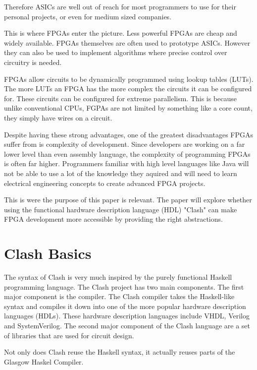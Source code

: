 \documentclass{article}
\begin{document}
\begin{multicols}{2}
    Therefore ASICs are well out of reach for most programmers to use for their personal projects, or even for
    medium sized companies.

    This is where FPGAs enter the picture. Less powerful FPGAs are cheap and widely available. FPGAs themselves
    are often used to prototype ASICs. However they can also be used to implement algorithms where precise control
    over circuitry is needed.

    FPGAs allow circuits to be dynamically programmed using lookup tables (LUTs). The more LUTs an FPGA
    has the more complex the circuits it can be configured for. These circuits can be configured for
    extreme parallelism. This is because unlike conventional CPUs, FGPAs are not limited by something like a core count,
    they simply have wires on a circuit.

    Despite having these strong advantages, one of the greatest disadvantages FPGAs suffer from is complexity of development.
    Since developers are working on a far lower level than even assembly language, the complexity
    of programming FPGAs is often far higher. Programmers familiar with high level languages
    like Java will not be able to use a lot of the knowledge they aquired and will need to learn electrical engineering
    concepts to create advanced FPGA projects.

    This is were the purpose of this paper is relevant. The paper will explore whether using the
    functional hardware description language (HDL) "Clash" can make FPGA development more accessible by providing
    the right abstractions.    
    
    \section{Clash Basics}

    The syntax of Clash is very much inspired by the purely functional Haskell programming language.
    The Clash project has two main components. The first major component is the compiler.
    The Clash compiler takes the Haskell-like syntax and compiles it down
    into one of the more popular hardware description languages (HDLs).
    These hardware description languages include VHDL, Verilog and SystemVerilog.
    The second major component of the Clash language are a set of libraries that
    are used for circuit design.

    Not only does Clash reuse the Haskell syntax, it actually reuses parts of the
    Glasgow Haskel Compiler.


\end{multicols}
\end{document}
